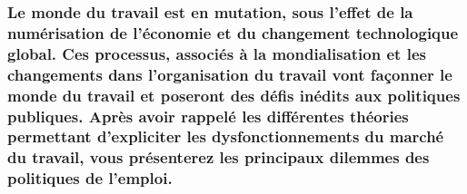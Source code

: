 \newpage %
	\subsubsection*{Le monde du travail est en mutation, sous l’effet de la numérisation de l’économie et du changement technologique global. Ces processus, associés à la mondialisation et les changements dans l’organisation du travail vont façonner le monde du travail et poseront des défis inédits aux politiques publiques. \newline \newline Après avoir rappelé les différentes théories permettant d’expliciter les dysfonctionnements du marché du travail, vous présenterez les principaux dilemmes des politiques de l’emploi. 
	}
